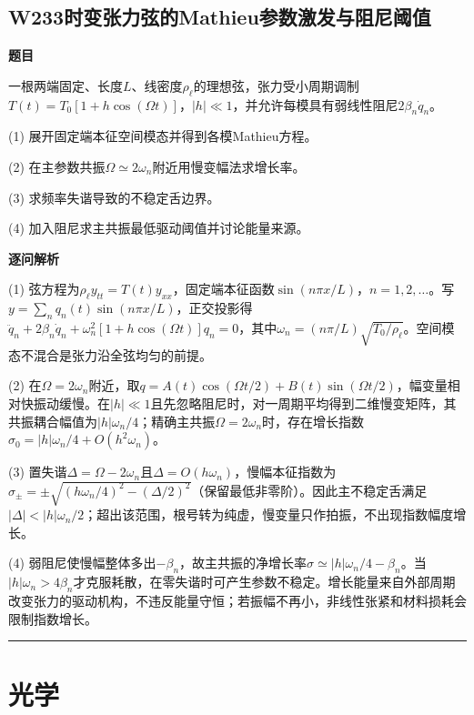 \documentclass[UTF8,a4paper,11pt,oneside,openany]{ctexbook}
\begin{document}
\section*{W233\quad 时变张力弦的Mathieu参数激发与阻尼阈值}
\textbf{题目}\par
一根两端固定、长度$L$、线密度$\rho_\ell$的理想弦，张力受小周期调制$T(t)=T_0[1+h\cos(\Omega t)]$，$|h|\ll1$，并允许每模具有弱线性阻尼$2\beta_n\dot q_n$。
\par\smallskip\noindent (1) 展开固定端本征空间模态并得到各模Mathieu方程。
\par\smallskip\noindent (2) 在主参数共振$\Omega\simeq2\omega_n$附近用慢变幅法求增长率。
\par\smallskip\noindent (3) 求频率失谐导致的不稳定舌边界。
\par\smallskip\noindent (4) 加入阻尼求主共振最低驱动阈值并讨论能量来源。
\par\medskip\textbf{逐问解析}\par
\par\smallskip\noindent (1) 弦方程为$\rho_\ell y_{tt}=T(t)y_{xx}$，固定端本征函数$\sin(n\pi x/L)$，$n=1,2,\ldots$。写$y=\sum_nq_n(t)\sin(n\pi x/L)$，正交投影得$\ddot q_n+2\beta_n\dot q_n+\omega_n^2[1+h\cos(\Omega t)]q_n=0$，其中$\omega_n=(n\pi/L)\sqrt{T_0/\rho_\ell}$。空间模态不混合是张力沿全弦均匀的前提。
\par\smallskip\noindent (2) 在$\Omega=2\omega_n$附近，取$q=A(t)\cos(\Omega t/2)+B(t)\sin(\Omega t/2)$，幅变量相对快振动缓慢。在$|h|\ll1$且先忽略阻尼时，对一周期平均得到二维慢变矩阵，其共振耦合幅值为$|h|\omega_n/4$；精确主共振$\Omega=2\omega_n$时，存在增长指数$\sigma_0=|h|\omega_n/4+O(h^2\omega_n)$。
\par\smallskip\noindent (3) 置失谐$\Delta=\Omega-2\omega_n$且$\Delta=O(h\omega_n)$，慢幅本征指数为$\sigma_\pm=\pm\sqrt{(h\omega_n/4)^2-(\Delta/2)^2}$（保留最低非零阶）。因此主不稳定舌满足$|\Delta|<|h|\omega_n/2$；超出该范围，根号转为纯虚，慢变量只作拍振，不出现指数幅度增长。
\par\smallskip\noindent (4) 弱阻尼使慢幅整体多出$-\beta_n$，故主共振的净增长率$\sigma\simeq|h|\omega_n/4-\beta_n$。当$|h|\omega_n>4\beta_n$才克服耗散，在零失谐时可产生参数不稳定。增长能量来自外部周期改变张力的驱动机构，不违反能量守恒；若振幅不再小，非线性张紧和材料损耗会限制指数增长。
\par\medskip\hrule\medskip
\chapter{光学}
\end{document}
